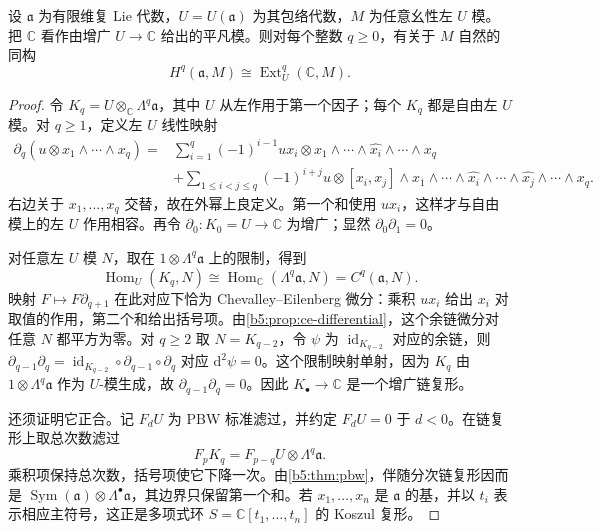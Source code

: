 \begin{proposition}\label{b5:prop:lie-cohomology-ext}
	设 \(\mathfrak a\) 为有限维复 Lie 代数，\(U=U(\mathfrak a)\) 为其包络代数，\(M\) 为任意幺性左 \(U\) 模。把 \(\mathbb C\) 看作由增广 \(U\to\mathbb C\) 给出的平凡模。则对每个整数 \(q\ge0\)，有关于 \(M\) 自然的同构
	\[
		H^q(\mathfrak a,M) \cong\operatorname{Ext}^q_U(\mathbb C,M).
	\]
\end{proposition}
\begin{proof}
	令 \(K_q=U\otimes_{\mathbb C}\Lambda^q\mathfrak a\)，其中 \(U\) 从左作用于第一个因子；每个 \(K_q\) 都是自由左 \(U\) 模。对 \(q\ge1\)，定义左 \(U\) 线性映射
	\begin{align*}
		\partial_q(u\otimes x_1\wedge\cdots\wedge x_q) ={}&\sum_{i=1}^q(-1)^{i-1}ux_i\otimes x_1\wedge\cdots\wedge\widehat{x_i}\wedge\cdots\wedge x_q\\
		&+\sum_{1\le i<j\le q}(-1)^{i+j}u\otimes [x_i,x_j]\wedge x_1\wedge\cdots\wedge\widehat{x_i} \wedge\cdots\wedge\widehat{x_j}\wedge\cdots\wedge x_q.
	\end{align*}
	右边关于 \(x_1,\ldots,x_q\) 交替，故在外幂上良定义。第一个和使用 \(ux_i\)，这样才与自由模上的左 \(U\) 作用相容。再令 \(\partial_0:K_0=U\to\mathbb C\) 为增广；显然 \(\partial_0\partial_1=0\)。

	对任意左 \(U\) 模 \(N\)，取在 \(1\otimes\Lambda^q\mathfrak a\) 上的限制，得到
	\[
		\operatorname{Hom}_U(K_q,N) \cong\operatorname{Hom}_{\mathbb C}(\Lambda^q\mathfrak a,N) =C^q(\mathfrak a,N).
	\]
	映射 \(F\mapsto F\partial_{q+1}\) 在此对应下恰为 Chevalley--Eilenberg 微分：乘积 \(ux_i\) 给出 \(x_i\) 对取值的作用，第二个和给出括号项。由\cref{b5:prop:ce-differential}，这个余链微分对任意 \(N\) 都平方为零。对 \(q\ge2\) 取 \(N=K_{q-2}\)，令 \(\psi\) 为 \(\operatorname{id}_{K_{q-2}}\) 对应的余链，则 \(\partial_{q-1}\partial_q=\operatorname{id}_{K_{q-2}}\circ\partial_{q-1}\circ\partial_q\) 对应 \(\mathrm d^2\psi=0\)。这个限制映射单射，因为 \(K_q\) 由 \(1\otimes\Lambda^q\mathfrak a\) 作为 \(U\)-模生成，故 \(\partial_{q-1}\partial_q=0\)。因此 \(K_\bullet\to\mathbb C\) 是一个增广链复形。

	还须证明它正合。记 \(F_dU\) 为 PBW 标准滤过，并约定 \(F_dU=0\) 于 \(d<0\)。在链复形上取总次数滤过
	\[
		F_pK_q=F_{p-q}U\otimes\Lambda^q\mathfrak a.
	\]
	乘积项保持总次数，括号项使它下降一次。由\cref{b5:thm:pbw}，伴随分次链复形因而是 \(\operatorname{Sym}(\mathfrak a)\otimes\Lambda^\bullet\mathfrak a\)，其边界只保留第一个和。若 \(x_1,\ldots,x_n\) 是 \(\mathfrak a\) 的基，并以 \(t_i\) 表示相应主符号，这正是多项式环 \(S=\mathbb C[t_1,\ldots,t_n]\) 的 Koszul 复形。


\end{proof}

